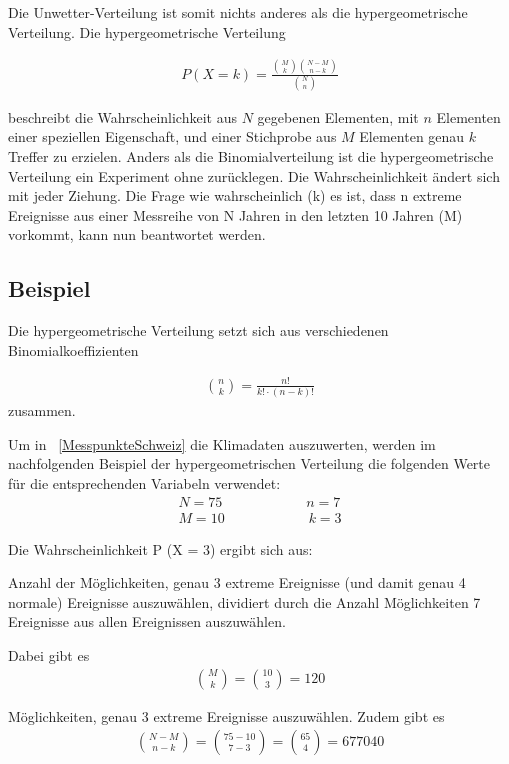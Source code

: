 \begin{refsection}
Die Unwetter-Verteilung ist somit nichts anderes als die hypergeometrische Verteilung. Die hypergeometrische Verteilung

\begin{align*}
P(X = k) = 
\frac{ \binom{M}{k} \binom{N-M}{n-k}}{ \binom{N}{n} }
\end{align*}

beschreibt die Wahrscheinlichkeit aus $N$ gegebenen Elementen, mit $n$ Elementen einer speziellen Eigenschaft, und einer Stichprobe aus $M$ Elementen genau $k$ Treffer zu erzielen. 
Anders als die Binomialverteilung ist die hypergeometrische Verteilung ein Experiment ohne zurücklegen. Die Wahrscheinlichkeit ändert sich mit jeder Ziehung. Die Frage wie wahrscheinlich (k) es ist, dass n extreme Ereignisse aus einer Messreihe von N Jahren in den letzten 10 Jahren (M) vorkommt, kann nun beantwortet werden.


\subsection{Beispiel} \label{Beispiel}
Die hypergeometrische Verteilung setzt sich aus verschiedenen Binomialkoeffizienten

\begin{align*}
\binom{n}{k} = \frac {n!}{k! \cdot (n-k)!} 
\end{align*}
zusammen.

Um in ~\ref{MesspunkteSchweiz}  die Klimadaten auszuwerten, werden im nachfolgenden Beispiel der hypergeometrischen Verteilung die folgenden Werte für die entsprechenden Variabeln verwendet:
\begin{align*}
N = 75 \quad \quad \quad \quad \quad \quad 
n = 7 \\
M = 10 \quad \quad \quad \quad \quad \quad 
k = 3
\end{align*}

Die Wahrscheinlichkeit P (X = 3) ergibt sich aus:

Anzahl der Möglichkeiten, genau 3 extreme Ereignisse (und damit genau 4 normale) Ereignisse auszuwählen, dividiert durch die Anzahl Möglichkeiten 7 Ereignisse aus allen Ereignissen auszuwählen.
 
Dabei gibt es
\begin{align*}
\binom{M}{k} = \binom{10}{3} = 120
\end{align*}

Möglichkeiten, genau 3 extreme Ereignisse auszuwählen.
Zudem gibt es 
\begin{align*}
\binom{N-M}{n-k} = \binom{75-10}{7-3} = \binom{65}{4} = 677040
\end{align*}


\end{refsection}
